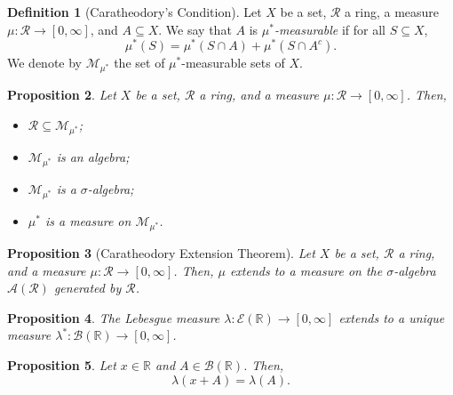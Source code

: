 \documentclass[a4paper, openany]{memoir}
\theoremstyle{definition}
\newtheorem{definition}{Definition}[section]
\theoremstyle{plain}
\newtheorem{proposition}[definition]{Proposition}
\begin{document}
    \begin{definition}[Caratheodory's Condition]
        Let $X$ be a set, $\mathcal{R}$ a ring, a measure $\mu \colon \mathcal{R} \to [0, \infty]$, and $A \subseteq X$. We say that $A$ is \emph{$\mu^*$-measurable} if for all $S \subseteq X$,
        \[\mu^*(S) = \mu^*(S \cap A) + \mu^*(S \cap A^c).\]
        We denote by $\mathcal{M}_{\mu^*}$ the set of $\mu^*$-measurable sets of $X$.
    \end{definition}

    \begin{proposition}
        Let $X$ be a set, $\mathcal{R}$ a ring, and a measure $\mu \colon \mathcal{R} \to [0, \infty]$. Then,
        \begin{itemize}
            \item $\mathcal{R} \subseteq \mathcal{M}_{\mu^*}$;
            \item $\mathcal{M}_{\mu^*}$ is an algebra;
            \item $\mathcal{M}_{\mu^*}$ is a $\sigma$-algebra;
            \item $\mu^*$ is a measure on $\mathcal{M}_{\mu^*}$.
        \end{itemize}
    \end{proposition}

    \begin{proposition}[Caratheodory Extension Theorem]
        Let $X$ be a set, $\mathcal{R}$ a ring, and a measure $\mu \colon \mathcal{R} \to [0, \infty]$. Then, $\mu$ extends to a measure on the $\sigma$-algebra $\mathcal{A}(\mathcal{R})$ generated by $\mathcal{R}$.
    \end{proposition}

    \begin{proposition}
        The Lebesgue measure $\lambda \colon \mathcal{E}(\mathbb{R}) \to [0, \infty]$ extends to a unique measure $\lambda^* \colon \mathcal{B}(\mathbb{R}) \to [0, \infty]$.
    \end{proposition}

    \begin{proposition}
        Let $x \in \mathbb{R}$ and $A \in \mathcal{B}(\mathbb{R})$. Then, 
        \[\lambda(x + A) = \lambda(A).\]
    \end{proposition}
    
\end{document}
